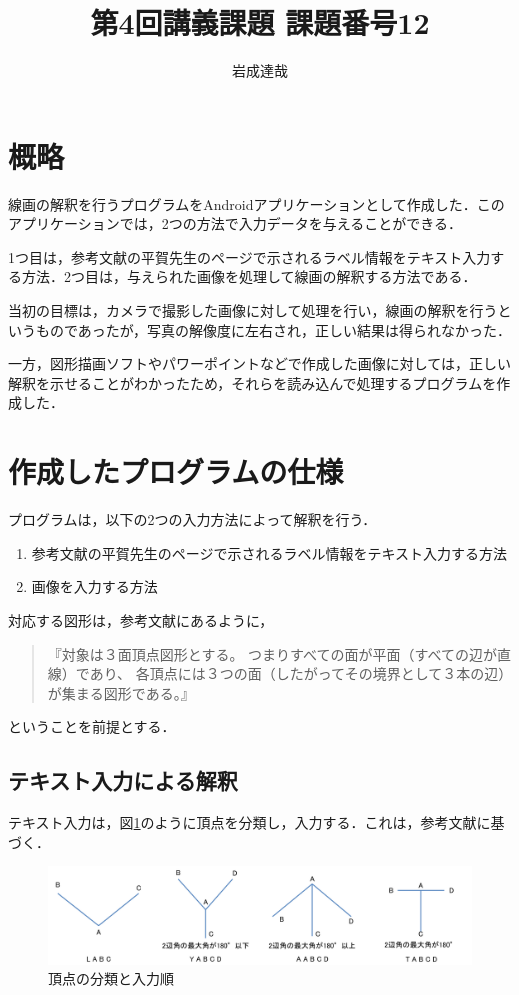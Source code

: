 \documentclass{jarticle}
\title{第4回講義課題 課題番号12}
\date{\todayd}
\author{岩成達哉}
\begin{document}
\begin{titlepage}
	\setlength{\topmargin}{1.1in}
	\vspace{100mm}
	\maketitle
\end{titlepage}


\section{概略}
線画の解釈を行うプログラムをAndroidアプリケーションとして作成した．このアプリケーションでは，2つの方法で入力データを与えることができる．

1つ目は，参考文献\cite{ref:labeling}の平賀先生のページで示されるラベル情報をテキスト入力する方法．2つ目は，与えられた画像を処理して線画の解釈する方法である．

当初の目標は，カメラで撮影した画像に対して処理を行い，線画の解釈を行うというものであったが，写真の解像度に左右され，正しい結果は得られなかった．

一方，図形描画ソフトやパワーポイントなどで作成した画像に対しては，正しい解釈を示せることがわかったため，それらを読み込んで処理するプログラムを作成した．


\section{作成したプログラムの仕様}
プログラムは，以下の2つの入力方法によって解釈を行う．
\begin{enumerate}
\item 参考文献\cite{ref:labeling}の平賀先生のページで示されるラベル情報をテキスト入力する方法
\item 画像を入力する方法
\end{enumerate}

対応する図形は，参考文献\cite{ref:labeling}にあるように，
\begin{quote}
『対象は３面頂点図形とする。
つまりすべての面が平面（すべての辺が直線）であり、 各頂点には３つの面（したがってその境界として３本の辺）が集まる図形である。』
\end{quote}
ということを前提とする．


\subsection{テキスト入力による解釈}
テキスト入力は，図\ref{fig:labeling}のように頂点を分類し，入力する．これは，参考文献\cite{ref:labeling}に基づく．
\begin{figure}[H]
\begin{center}
\includegraphics[width=180mm]{image/labeling.png}
\caption{頂点の分類と入力順}
\label{fig:labeling}
\end{center}
\end{figure}
\end{document}
